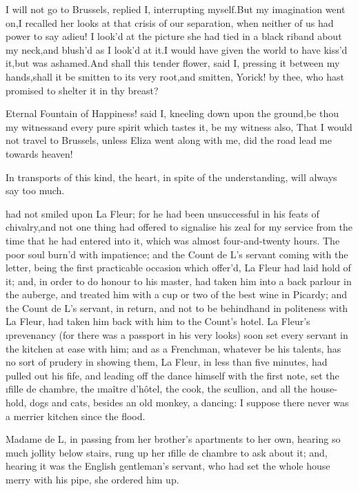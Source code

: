 \documentclass[twoside]{article}
\begin{document}
\tsk I will not go to Brussels, replied I, interrupting myself.\tsk But my
imagination went on,\tsk I recalled her looks at that crisis of our
separation, when neither of us had power to say adieu!  I look’d at the
picture she had tied in a black riband about my neck,\tsk and blush’d as I
look’d at it.\tsk I would have given the world to have kiss’d it,\tsk but was
ashamed.\tsk And shall this tender flower, said I, pressing it between my
hands,\tsk shall it be smitten to its very root,\tsk and smitten, Yorick! by
thee, who hast promised to shelter it in thy breast?

Eternal Fountain of Happiness! said I, kneeling down upon the ground,\tsk be
thou my witness\tsk and every pure spirit which tastes it, be my witness
also, That I would not travel to Brussels, unless Eliza went along with
me, did the road lead me towards heaven!

In transports of this kind, the heart, in spite of the understanding,
will always say too much.






 had not smiled upon La Fleur; for he had been unsuccessful in his
feats of chivalry,\tsk and not one thing had offered to signalise his zeal
for my service from the time that he had entered into it, which was
almost four-and-twenty hours.  The poor soul burn’d with impatience; and
the Count de L\tsk ’s servant coming with the letter, being the first
practicable occasion which offer’d, La Fleur had laid hold of it; and, in
order to do honour to his master, had taken him into a back parlour in
the auberge, and treated him with a cup or two of the best wine in
Picardy; and the Count de L\tsk ’s servant, in return, and not to be
behindhand in politeness with La Fleur, had taken him back with him to
the Count’s hotel.  La Fleur’s \i{prevenancy} (for there was a passport in
his very looks) soon set every servant in the kitchen at ease with him;
and as a Frenchman, whatever be his talents, has no sort of prudery in
showing them, La Fleur, in less than five minutes, had pulled out his
fife, and leading off the dance himself with the first note, set the
\i{fille de chambre}, the \i{maître d’hôtel}, the cook, the scullion, and all
the house-hold, dogs and cats, besides an old monkey, a dancing: I
suppose there never was a merrier kitchen since the flood.

Madame de L\tsk , in passing from her brother’s apartments to her own,
hearing so much jollity below stairs, rung up her \i{fille de chambre} to
ask about it; and, hearing it was the English gentleman’s servant, who
had set the whole house merry with his pipe, she ordered him up.
\end{document}
